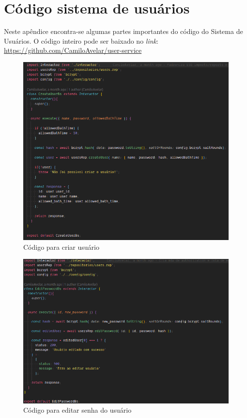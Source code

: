 \chapter{Código sistema de usuários}

Neste apêndice encontra-se algumas partes importantes do código do Sistema de Usuários. O código inteiro pode ser baixado no \textit{link}: \url{https://github.com/CamiloAvelar/user-service}

\begin{figure}[htbp]
	\centering
	\includegraphics[width=1\linewidth]{figuras/userservice/createuser.png}
	\caption{Código para criar usuário}
	\label{fig:createuser}
\end{figure}

\begin{figure}[htbp]
	\centering
	\includegraphics[width=1\linewidth]{figuras/userservice/editpassword.png}
	\caption{Código para editar senha do usuário}
	\label{fig:editpass}
\end{figure}

